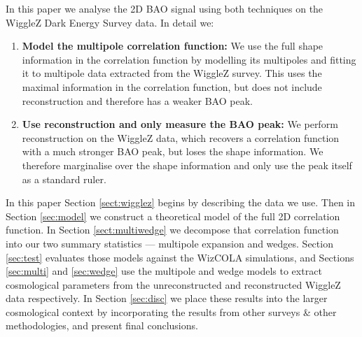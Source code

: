 \documentclass[iop,twocolappendix]{emulateapj}
\begin{document}
In this paper we analyse the 2D BAO signal using both techniques on the WiggleZ Dark Energy Survey data.  In detail we:
\begin{enumerate}
\item {\bf Model the multipole correlation function:} We use the full shape information in the correlation function by modelling its multipoles and fitting it to multipole data extracted from the WiggleZ survey.  This uses the maximal information in the correlation function, but does not include reconstruction and therefore has a weaker BAO peak. 
\item {\bf Use reconstruction and only measure the BAO peak:}  We perform reconstruction on the WiggleZ data, which recovers a correlation function with a much stronger BAO peak, but loses the shape information.  We therefore marginalise over the shape information and only use the peak itself as a standard ruler. 
\end{enumerate}

In this paper Section \ref{sect:wigglez} begins by describing the data we use.  Then in Section \ref{sec:model} we construct a theoretical model of the full 2D correlation function.  In Section \ref{sect:multiwedge} we decompose that correlation function into our two summary statistics --- multipole expansion and wedges.
Section \ref{sec:test} evaluates those models against the WizCOLA simulations, and Sections \ref{sec:multi} and \ref{sec:wedge} use the multipole and wedge models to extract cosmological parameters from the unreconstructed and reconstructed WiggleZ data respectively. In Section \ref{sec:disc} we place these results into the larger cosmological context by incorporating the results from other surveys \& other methodologies, and present final conclusions.
\end{document}
